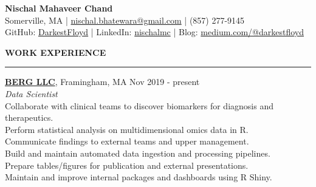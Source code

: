 \documentclass[a4paper]{article}
\newcommand{\myline}{\par
  \kern2pt %
  \hrule height 0.5pt
  \kern2pt %
}
\newcommand{\mybullet}{
	\indent 
  \textbullet \hspace*{2mm}
}
\begin{document}
	\begin{center}
		{\LARGE \textbf{Nischal Mahaveer Chand}} \\
    Somerville, MA | 
    \href{mailto:nischal.bhatewara@gmail.com}{nischal.bhatewara@gmail.com} | 
    (857) 277-9145 \\
                GitHub: \href{https://github.com/darkestfloyd}{DarkestFloyd} | 
                LinkedIn: \href{https://www.linkedin.com/in/nischalmc}{nischalmc} |
		Blog: \href{https://medium.com/@darkestfloyd}{medium.com/@darkestfloyd} \\
	\end{center}
	


	\smallskip
	\smallskip
	\noindent
	{\large \textbf{WORK EXPERIENCE}}
	\myline 
	\smallskip
	
  \noindent
  \textbf{\href{https://www.berghealth.com/}{BERG LLC}}, Framingham, MA
  \hfill Nov 2019 - present \\
  \textit{Data Scientist} \\
  \mybullet Collaborate with clinical teams to discover biomarkers for diagnosis and therapeutics. \\
  \mybullet Perform statistical analysis on multidimensional omics data in R. \\
  \mybullet Communicate findings to external teams and upper management. \\
  \mybullet Build and maintain automated data ingestion and processing pipelines. \\
  \mybullet Prepare tables/figures for publication and external presentations. \\
  \mybullet Maintain and improve internal packages and dashboards using R Shiny. \\
\end{document}
